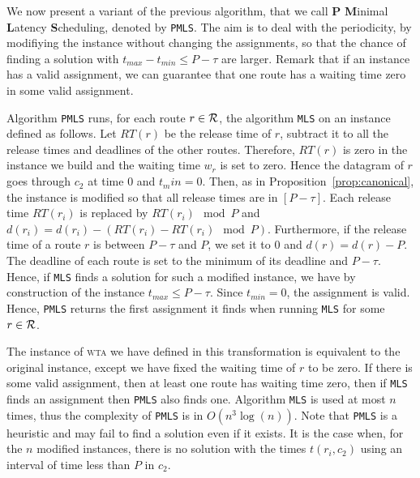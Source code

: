 \documentclass[a4paper,10pt]{article}
\newcommand\MLS{\texttt{MLS}\xspace}
\newcommand\PMLS{\texttt{PMLS}\xspace}
\newcommand\wta{\textsc{wta}\xspace}
\begin{document}
     We now present a variant of the previous algorithm, that we call
     \textbf{P} \textbf{M}inimal \textbf{L}atency \textbf{S}cheduling, denoted by \PMLS. The aim is to deal with the periodicity, by modifiying the instance without changing the assignments, so that the chance of finding a solution with $t_{max}- t_{min} \leq P -\tau $ are larger.  Remark that if an instance has a valid assignment, we can guarantee that one route has a waiting time zero in some valid assignment. 
     
     Algorithm \PMLS runs, for each route $r \in \cal{R}$, the algorithm \MLS on an instance defined as follows. Let $RT(r)$ be the release time of $r$, subtract it to all the release times and deadlines of the other routes. Therefore, $RT(r)$ is zero in the instance we build and the waiting time $w_r$ is set to zero. Hence the datagram of $r$ goes through $c_2$ at time $0$ and $t_min = 0$.
     Then, as in Proposition~\ref{prop:canonical}, the instance is modified so that all release times are in $[P-\tau]$. Each release time $RT(r_i)$ is replaced by $RT(r_i) \mod P$ and $d(r_i) = d(r_i) - (RT(r_i) - RT(r_i) \mod P)$. Furthermore, if the release time of a route $r$ is between $P-\tau$ and $P$, we set it to $0$ and $d(r) = d(r) - P$.  The deadline of each route is set to the minimum of its deadline and $P - \tau$. Hence, if \MLS finds a solution for such a modified instance, we have by construction of the instance $t_{max} \leq P -\tau $. Since $t_{min} = 0$, the assignment is valid. Hence, \PMLS
     returns the first assignment it finds when running \MLS for some $r \in \cal{R}$.

     The instance of \wta we have defined in this transformation is equivalent 
     to the original instance, except we have fixed the waiting time of 
   $r$ to be zero. If there is some valid assignment, then at least one route has waiting time zero, then if \MLS finds an assignment then \PMLS also finds one. Algorithm \MLS is used at most $n$ times, thus the complexity of \PMLS is in $O(n^3\log(n))$. Note that \PMLS is a heuristic and may fail to find a solution even if it exists. It is the case when, for the $n$ modified instances, there is no solution with the times $t(r_i,c_2)$ using an interval of time less than $P$ in $c_2$. 
\end{document}
